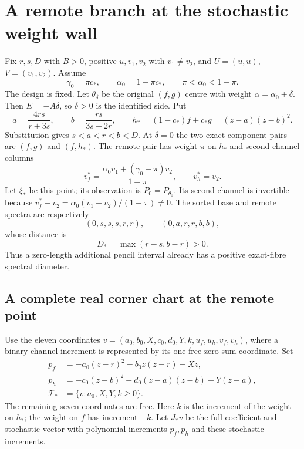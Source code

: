 \section{A remote branch at the stochastic weight wall}\label{sec:wall}
Fix $r,s,D$ with $B>0$, positive $u,v_1,v_2$ with $v_1\ne v_2$,
and $U=(u,u)$, $V=(v_1,v_2)$. Assume
\begin{equation}\label{eq:wall-centre}
 \gamma_0=\pi c_*,\qquad \alpha_0=1-\pi c_*,\qquad
                   \pi<\alpha_0<1-\pi.
\end{equation}
The design is fixed. Let $\theta_\delta$ be the original $(f,g)$ centre
with weight $\alpha=\alpha_0+\delta$. Then $E=-A\delta$, so
$\delta>0$ is the identified side. Put
\begin{equation}\label{eq:abstar}
 a=\frac{4rs}{r+3s},\qquad b=\frac{rs}{3s-2r},\qquad
 h_*=(1-c_*)f+c_*g=(z-a)(z-b)^2.
\end{equation}
Substitution gives $s<a<r<b<D$. At $\delta=0$ the two exact component
pairs are $(f,g)$ and $(f,h_*)$. The remote pair has weight $\pi$ on
$h_*$ and second-channel columns
\begin{equation}\label{eq:remote-channel}
 v_f^*=\frac{\alpha_0v_1+(\gamma_0-\pi)v_2}{1-\pi},\qquad v_h^*=v_2.
\end{equation}
Let $\xi_*$ be this point; its observation is $P_0=P_{\theta_0}$.
Its second channel is invertible because
$v_f^*-v_2=\alpha_0(v_1-v_2)/(1-\pi)\ne0$.
The sorted base and remote spectra are respectively
\[
 (0,s,s,s,r,r),\qquad (0,a,r,r,b,b),
\]
whose distance is
\begin{equation}\label{eq:Dstar}
 D_* =\max(r-s,b-r)>0.
\end{equation}
Thus a zero-length additional pencil interval already has a positive
exact-fibre spectral diameter.

\subsection{A complete real corner chart at the remote point}
Use the eleven coordinates
$v=(a_0,b_0,X,c_0,d_0,Y,k,\dot u_f,\dot u_h,\dot v_f,\dot v_h)$,
where a binary channel increment is represented by its one free
zero-sum coordinate. Set
\begin{align}
 p_f&=-a_0(z-r)^2-b_0z(z-r)-Xz,\nonumber\\
 p_h&=-c_0(z-b)^2-d_0(z-a)(z-b)-Y(z-a),\label{eq:remote-jets}\\
 \mathcal T_*&=\{v:a_0,X,Y,k\ge0\}.\nonumber
\end{align}
The remaining seven coordinates are free. Here $k$ is the increment
of the weight on $h_*$; the weight on $f$ has increment $-k$.
Let $J_*v$ be the full coefficient and stochastic vector with polynomial
increments $p_f,p_h$ and these stochastic increments.

